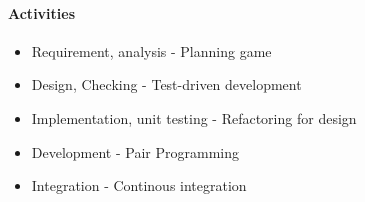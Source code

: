 \documentclass[12pt]{article}
\begin{document}
   		\paragraph{Activities}
   		\begin{itemize}
   			\item Requirement, analysis - Planning game
    		\item Design, Checking - Test-driven development
    		\item Implementation, unit testing - Refactoring for design 
    		\item Development - Pair Programming
    		\item Integration - Continous integration
   		\end{itemize}
\end{document}
